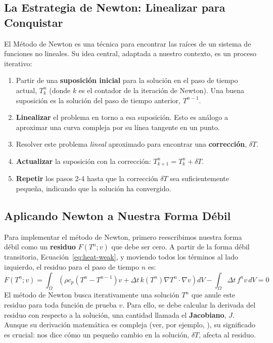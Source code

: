 \subsection{La Estrategia de Newton: Linealizar para Conquistar}
El Método de Newton es una técnica para encontrar las raíces de un sistema de funciones no lineales. Su idea central, adaptada a nuestro contexto, es un proceso iterativo:
\begin{enumerate}
    \item Partir de una \textbf{suposición inicial} para la solución en el paso de tiempo actual, \(T_k^n\) (donde \(k\) es el contador de la iteración de Newton). Una buena suposición es la solución del paso de tiempo anterior, \(T^{n-1}\).
    \item \textbf{Linealizar} el problema en torno a esa suposición. Esto es análogo a aproximar una curva compleja por su línea tangente en un punto.
    \item Resolver este problema \textit{lineal} aproximado para encontrar una \textbf{corrección}, \(\delta T\).
    \item \textbf{Actualizar} la suposición con la corrección: \(T_{k+1}^n = T_k^n + \delta T\).
    \item \textbf{Repetir} los pasos 2-4 hasta que la corrección \(\delta T\) sea suficientemente pequeña, indicando que la solución ha convergido.
\end{enumerate}

\subsection{Aplicando Newton a Nuestra Forma Débil}
Para implementar el método de Newton, primero reescribimos nuestra forma débil como un \textbf{residuo} \(F(T^n; v)\) que debe ser cero. A partir de la forma débil transitoria, Ecuación~\eqref{eq:heat-weak}, y moviendo todos los términos al lado izquierdo, el residuo para el paso de tiempo \(n\) es:
\begin{equation}
    F(T^n; v) = \int_{\Omega} \left( \rho c_p (T^n - T^{n-1}) v + \Delta t \, k(T^n) \nabla T^n \cdot \nabla v \right) dV - \int_{\Omega} \Delta t \, f^n v \, dV = 0
    \label{eq:nonlinear-residual}
\end{equation}
El método de Newton busca iterativamente una solución \(T^n\) que anule este residuo para toda función de prueba \(v\). Para ello, se debe calcular la derivada del residuo con respecto a la solución, una cantidad llamada el \textbf{Jacobiano}, \(J\). Aunque su derivación matemática es compleja (ver, por ejemplo, \cite{Elman2014}), su significado es crucial: nos dice cómo un pequeño cambio en la solución, \(\delta T\), afecta al residuo.

